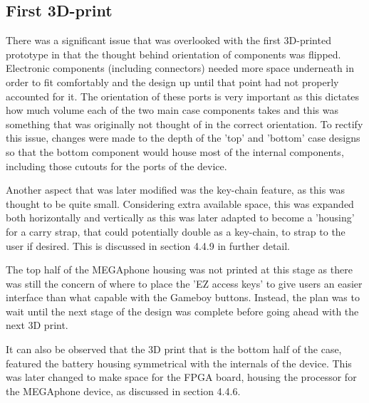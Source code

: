 \subsection{First 3D-print}

There was a significant issue that was overlooked with the first 3D-printed prototype in that the thought behind orientation of components was flipped.
Electronic components (including connectors) needed more space underneath in order to fit comfortably and the design up until that point had not properly accounted for it.
The orientation of these ports is very important as this dictates how much volume each of the two main case components takes and this was something that was originally not thought of in the correct orientation.
To rectify this issue, changes were made to the depth of the 'top' and 'bottom' case designs so that the bottom component would house most of the internal components, including those cutouts for the ports of the device.

Another aspect that was later modified was the key-chain feature, as this was thought to be quite small.
Considering extra available space, this was expanded both horizontally and vertically as this was later adapted to become a 'housing' for a carry strap, that could potentially double as a key-chain, to strap to the user if desired.
This is discussed in section 4.4.9 in further detail.

The top half of the MEGAphone housing was not printed at this stage as there was still the concern of where to place the 'EZ access keys' to give users an easier interface than what capable with the Gameboy buttons.
Instead, the plan was to wait until the next stage of the design was complete before going ahead with the next 3D print.

It can also be observed that the 3D print that is the bottom half of the case, featured the battery housing symmetrical with the internals of the device.
This was later changed to make space for the FPGA board, housing the processor for the MEGAphone device, as discussed in section 4.4.6.


